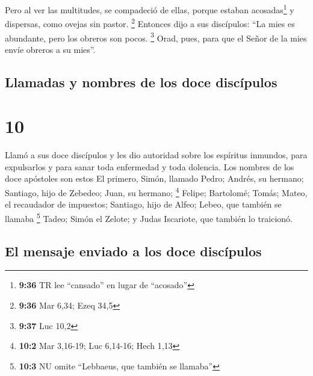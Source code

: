  Pero al ver las multitudes, se compadeció de ellas,
porque estaban acosadas\footnote{\textbf{9:36} TR lee ``cansado'' en
  lugar de ``acosado''} y dispersas, como ovejas sin pastor. \footnote{\textbf{9:36}
  Mar 6,34; Ezeq 34,5}  Entonces dijo a sus discípulos:
``La mies es abundante, pero los obreros son pocos. \footnote{\textbf{9:37}
  Luc 10,2}  Orad, pues, para que el Señor de la mies
envíe obreros a su mies''.

\hypertarget{llamadas-y-nombres-de-los-doce-discuxedpulos}{%
\subsection{Llamadas y nombres de los doce
discípulos}\label{llamadas-y-nombres-de-los-doce-discuxedpulos}}

\hypertarget{section-9}{%
\section{10}\label{section-9}}

 Llamó a sus doce discípulos y les dio autoridad sobre los
espíritus inmundos, para expulsarlos y para sanar toda enfermedad y toda
dolencia.  Los nombres de los doce apóstoles son estos El
primero, Simón, llamado Pedro; Andrés, su hermano; Santiago, hijo de
Zebedeo; Juan, su hermano; \footnote{\textbf{10:2} Mar 3,16-19; Luc
  6,14-16; Hech 1,13}  Felipe; Bartolomé; Tomás; Mateo, el
recaudador de impuestos; Santiago, hijo de Alfeo; Lebeo, que también se
llamaba \footnote{\textbf{10:3} NU omite ``Lebbaeus, que también se
  llamaba''} Tadeo;  Simón el Zelote; y Judas Iscariote,
que también lo traicionó.

\hypertarget{el-mensaje-enviado-a-los-doce-discuxedpulos}{%
\subsection{El mensaje enviado a los doce
discípulos}\label{el-mensaje-enviado-a-los-doce-discuxedpulos}}

